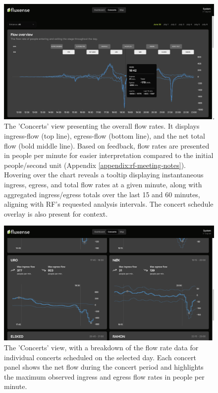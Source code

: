 \begin{figure}[ht]
  \centering
  \includegraphics[width=\textwidth]{Pictures/Misc/Frontend/flow_total.png}
  \caption{The 'Concerts' view presenting the overall flow rates. It displays ingress-flow (top line), egress-flow (bottom line), and the net total flow (bold middle line). Based on feedback, flow rates are presented in people per minute for easier interpretation compared to the initial people/second unit (Appendix \ref{appendix:rf-meeting-notes}). Hovering over the chart reveals a tooltip displaying instantaneous ingress, egress, and total flow rates at a given minute, along with aggregated ingress/egress totals over the last 15 and 60 minutes, aligning with RF's requested analysis intervals. The concert schedule overlay is also present for context.}
\end{figure}

\begin{figure}[ht]
  \centering
  \includegraphics[width=\textwidth]{Pictures/Misc/Frontend/flow_concerts.png}
  \caption{The 'Concerts' view, with a breakdown of the flow rate data for individual concerts scheduled on the selected day. Each concert panel shows the net flow during the concert period and highlights the maximum observed ingress and egress flow rates in people per minute.}
\end{figure}

